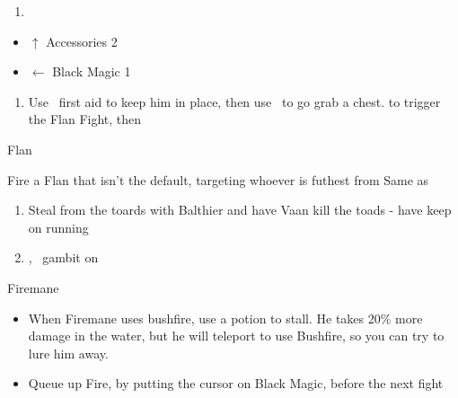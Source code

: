 \begin{enumerate}
\item \cs
\end{enumerate}
\begin{liscense}
\begin{itemize}
\vaanf
\begin{itemize}
\item $\uparrow$ Accessories 2
\item $\leftarrow$ Black Magic 1
\end{itemize}
\end{itemize}
\end{liscense}
\begin{gambit}
\begin{itemize}
\end{itemize}
\end{gambit}
\begin{enumerate}
\item Use \balthier\ first aid to keep him in place, then use \fran\ to go grab a chest. \leader{\balthier} to trigger the Flan Fight, then \leader{\fran}
\end{enumerate}
\begin{battle}{Flan}
\begin{itemize}
\franf Fire a Flan that isn't the default, targeting whoever is futhest from \ashe
\vaanf Same as \fran
\end{itemize}
\end{battle}
\begin{enumerate}
\item Steal from the toards with Balthier and have Vaan kill the toads - have \fran keep on running
\item \leader{\balthier}, \fran\ gambit on
\end{enumerate}

\begin{battle}{Firemane}
\begin{itemize}
\vaanf Attack
\balthierf Attack
\item When Firemane uses bushfire, use a potion to stall. He takes 20\% more damage in the water, but he will teleport to use Bushfire, so you can try to lure him away.
\item Queue up Fire, by putting the cursor on Black Magic, before the next fight
\end{itemize}
\end{battle}
